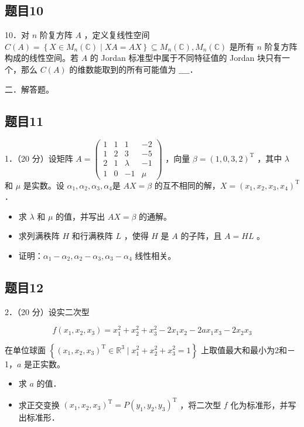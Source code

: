 \documentclass{article}
\begin{document}
\subsection{题目10}
10．对 \(n\) 阶复方阵 \(A\) ，定义复线性空间 \(C(A)=\left\{X \in M_{n}(\mathbb{C}) \mid X A=A X\right\} \subseteq M_{n}(\mathbb{C}), M_{n}(\mathbb{C})\) 是所有 \(n\) 阶复方阵构成的线性空间。若 \(A\) 的 Jordan 标准型中属于不同特征值的 Jordan 块只有一个，那么 \(C(A)\) 的维数能取到的所有可能值为 \(\_\_\_\_\)．

二．解答题。\\

\subsection{题目11}
1．（20 分）设矩阵 \(A=\left(\begin{array}{cccc}1 & 1 & 1 & -2 \\ 1 & 2 & 3 & -5 \\ 2 & 1 & \lambda & -1 \\ 1 & 0 & -1 & \mu\end{array}\right)\) ，向量 \(\beta=(1,0,3,2)^{\mathrm{T}}\) ，其中 \(\lambda\) 和 \(\mu\) 是实数。设 \(\alpha_{1}, \alpha_{2}, \alpha_{3}, \alpha_{4}\)是 \(A X=\beta\) 的互不相同的解，\(X=\left(x_{1}, x_{2}, x_{3}, x_{4}\right)^{\mathrm{T}}\) ．

\begin{itemize}
  \item[（1）] 求 \(\lambda\) 和 \(\mu\) 的值，并写出 \(A X=\beta\) 的通解。
  \item[（2）] 求列满秩阵 \(H\) 和行满秩阵 \(L\) ，使得 \(H\) 是 \(A\) 的子阵，且 \(A=H L\) 。
  \item[（3）] 证明：\(\alpha_{1}-\alpha_{2}, \alpha_{2}-\alpha_{3}, \alpha_{3}-\alpha_{4}\) 线性相关。
\end{itemize}

\subsection{题目12}
2．（20 分）设实二次型

\[
f\left(x_{1}, x_{2}, x_{3}\right)=x_{1}^{2}+x_{2}^{2}+x_{3}^{2}-2 x_{1} x_{2}-2 a x_{1} x_{3}-2 x_{2} x_{3}
\]

在单位球面 \(\left\{\left(x_{1}, x_{2}, x_{3}\right)^{\mathrm{T}} \in \mathbb{R}^{3} \mid x_{1}^{2}+x_{2}^{2}+x_{3}^{2}=1\right\}\) 上取值最大和最小为2和－1，\(a\) 是正实数。

\begin{itemize}
  \item[（1）] 求 \(a\) 的值．
  \item[（2）] 求正交变换 \(\left(x_{1}, x_{2}, x_{3}\right)^{\mathrm{T}}=P\left(y_{1}, y_{2}, y_{3}\right)^{\mathrm{T}}\) ，将二次型 \(f\) 化为标准形，并写出标准形．
\end{itemize}
\end{document}
